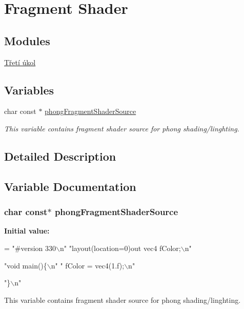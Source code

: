 \hypertarget{group__fs}{}\section{Fragment Shader}
\label{group__fs}
\subsection*{Modules}
\begin{DoxyCompactItemize}
\item 
\hyperlink{group__task3}{Třetí úkol}
\end{DoxyCompactItemize}
\subsection*{Variables}
\begin{DoxyCompactItemize}
\item 
char const $\ast$ \hyperlink{group__fs_ga1ad4f4cb5068a39b247fbd8bb4428a75}{phong\+Fragment\+Shader\+Source}
\begin{DoxyCompactList}\small\item\em This variable contains fragment shader source for phong shading/linghting. \end{DoxyCompactList}\end{DoxyCompactItemize}


\subsection{Detailed Description}


\subsection{Variable Documentation}
\hypertarget{group__fs_ga1ad4f4cb5068a39b247fbd8bb4428a75}{}
\subsubsection[{phong\+Fragment\+Shader\+Source}]{\setlength{\rightskip}{0pt plus 5cm}char const$\ast$ phong\+Fragment\+Shader\+Source}\label{group__fs_ga1ad4f4cb5068a39b247fbd8bb4428a75}
{\bfseries Initial value\+:}
\begin{DoxyCode}
= 
\textcolor{stringliteral}{"#version 330\(\backslash\)n"}
\textcolor{stringliteral}{"layout(location=0)out vec4 fColor;\(\backslash\)n"}


\textcolor{stringliteral}{"void main()\{\(\backslash\)n"}
\textcolor{stringliteral}{"  fColor = vec4(1.f);\(\backslash\)n"}


\textcolor{stringliteral}{"\}\(\backslash\)n"}
\end{DoxyCode}


This variable contains fragment shader source for phong shading/linghting. 

